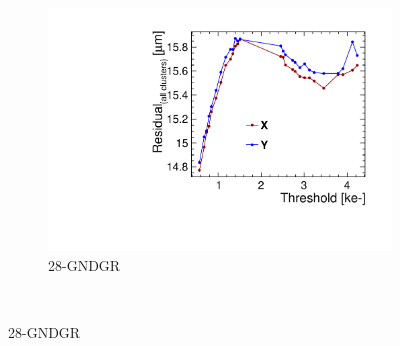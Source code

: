 \begin{figure}[htbp]
\begin{subfigure}[b]{0.33\textwidth}
    \includegraphics[width=\textwidth]{./figures/TestBeam/residuals_W0019_L08_THLscan.pdf}
    \caption{28-GNDGR}
  \end{subfigure} \\


\end{figure}
